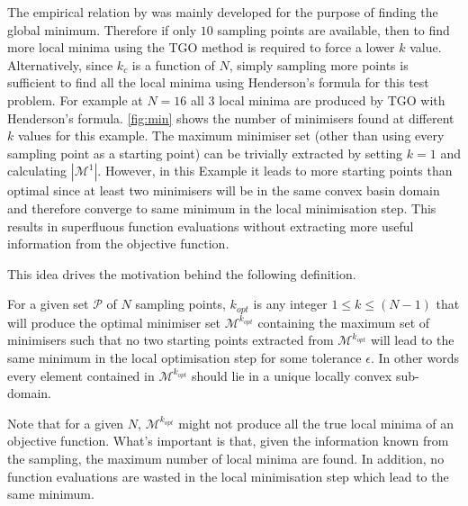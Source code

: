The empirical relation by \citet{Henderson2015} was mainly developed for the purpose of finding the global minimum. Therefore if only $10$ sampling points are available, then to find more local minima using the TGO method is required to force a lower $k$ value. Alternatively, since $k_c$ is a function of $N$, simply sampling more points is sufficient to find all the local minima using Henderson's formula for this test problem. For example at $N=16$ all 3 local minima are produced by TGO with Henderson's formula. \autoref{fig:min} shows the number of minimisers found at different $k$ values for this example. The maximum minimiser set (other than using every sampling point as a starting point) can be trivially extracted by setting $k=1$ and calculating $|\mathcal{M}^1|$. However, in this Example it leads to more starting points than optimal since at least two minimisers will be in the same convex basin domain and therefore converge to same minimum in the local minimisation step. This results in superfluous function evaluations without extracting more useful information from the objective function. 

This idea drives the motivation behind the following definition.
\begin{definition} \label{def:optpool}
For a given set $\mathcal{P}$ of $N$ sampling points, $k_{opt}$ is any integer $1 \leq k \leq (N -1)$ that will produce the optimal minimiser set $\mathcal{M}^{k_{opt}}$ containing the maximum set of minimisers such that no two starting points extracted from $\mathcal{M}^{k_{opt}}$ will lead to the same minimum in the local optimisation step for some tolerance $\epsilon$. In other words every element contained in $\mathcal{M}^{k_{opt}}$ should lie in a unique locally convex sub-domain.
\end{definition}

Note that for a given $N$, $\mathcal{M}^{k_{opt}}$ might not produce all the true local minima of an objective function. What's important is that, given the information known from the sampling, the maximum number of local minima are found. In addition, no function evaluations are wasted in the local minimisation step which lead to the same minimum.



